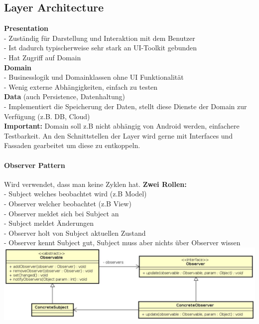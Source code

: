 \subsection{Layer Architecture}
\textbf{Presentation} \\
- Zuständig für Darstellung und Interaktion mit dem Benutzer \\
- Ist dadurch typischerweise sehr stark an UI-Toolkit gebunden \\
- Hat Zugriff auf Domain \\
\textbf{Domain} \\
- Businesslogik und Domainklassen ohne UI Funktionalität \\
- Wenig externe Abhängigkeiten, einfach zu testen \\
\textbf{Data} (auch Persistence, Datenhaltung)\\
- Implementiert die Speicherung der Daten, stellt diese Dienste der Domain zur Verfügung (z.B. DB, Cloud) \\
\textbf{Important:} Domain soll z.B nicht abhängig von Android werden, einfachere Testbarkeit. An den Schnittstellen der Layer wird gerne mit Interfaces und Fassaden gearbeitet um diese zu entkoppeln.

\paragraph{Observer Pattern}
Wird verwendet, dass man keine Zyklen hat.
\textbf{Zwei Rollen:} \\
- Subject welches beobachtet wird (z.B Model) \\
- Observer welcher beobachtet (z.B View) \\
- Observer meldet sich bei Subject an \\
- Subject meldet Änderungen \\
- Observer holt von Subject aktuellen Zustand \\
- Observer kennt Subject gut, Subject muss aber nichts über Observer wissen \\ 
\includegraphics[scale=0.2]{img/observerpattern.png}



